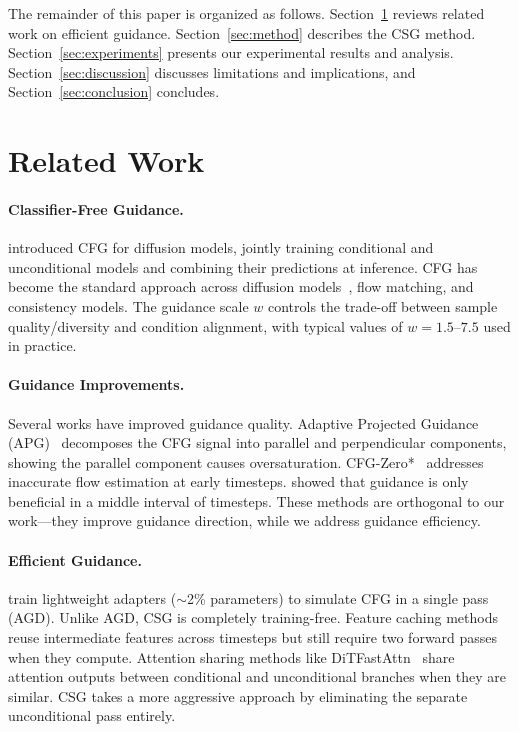 \documentclass{article}
\begin{document}
The remainder of this paper is organized as follows. Section~\ref{sec:related} reviews related work on efficient guidance. Section~\ref{sec:method} describes the CSG method. Section~\ref{sec:experiments} presents our experimental results and analysis. Section~\ref{sec:discussion} discusses limitations and implications, and Section~\ref{sec:conclusion} concludes.

\section{Related Work}
\label{sec:related}

\paragraph{Classifier-Free Guidance.}
\citet{ho2022classifierfree} introduced CFG for diffusion models, jointly training conditional and unconditional models and combining their predictions at inference. CFG has become the standard approach across diffusion models~\citep{lipman2023flow}, flow matching, and consistency models. The guidance scale $w$ controls the trade-off between sample quality/diversity and condition alignment, with typical values of $w = 1.5$--$7.5$ used in practice.

\paragraph{Guidance Improvements.}
Several works have improved guidance quality. Adaptive Projected Guidance (APG)~\citep{sadat2024eliminating} decomposes the CFG signal into parallel and perpendicular components, showing the parallel component causes oversaturation. CFG-Zero*~\citep{fan2025cfgzero} addresses inaccurate flow estimation at early timesteps. \citet{kynkaanniemi2024applying} showed that guidance is only beneficial in a middle interval of timesteps. These methods are orthogonal to our work---they improve guidance direction, while we address guidance efficiency.

\paragraph{Efficient Guidance.}
\citet{phan2025efficient} train lightweight adapters ($\sim$2\% parameters) to simulate CFG in a single pass (AGD). Unlike AGD, CSG is completely training-free. Feature caching methods reuse intermediate features across timesteps but still require two forward passes when they compute. Attention sharing methods like DiTFastAttn~\citep{zheng2024ditfastattn} share attention outputs between conditional and unconditional branches when they are similar. CSG takes a more aggressive approach by eliminating the separate unconditional pass entirely.
\end{document}

